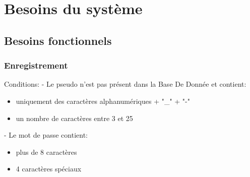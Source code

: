 \documentclass[french, utf8]{article}
\newcommand*{\MyIncludeGraphicsMaxSize}[2][]{%
\begin{adjustbox}{max size={\textwidth}{\textheight}}
    \texttt{[image: \#2]}%
\end{adjustbox}
}
\begin{document}
\newpage
\section{Besoins du système}

\subsection{Besoins fonctionnels}
\begin{comment}
\subsubsection{Lancement}
\label{sec:Lancement}
Le programme, à son lancement,
affiche une fenêtre d'accueil contenant le titre du jeu et demande à l’utilisateur d'entrer :
\\un pseudo
\\un mot de passe

\MyIncludeGraphicsMaxSize{Image/connexion-sequence-shrodinger-user.png}


\end{comment}

\subsubsection{Enregistrement}
\label{sec:Enregistrement}
Conditions:
\newline
- Le pseudo n'est pas présent dans la Base De Donnée et contient:
\begin{itemize}
\item uniquement des caractères alphanumériques + "\_" + "-"
\item un nombre de caractères entre 3 et 25
\end{itemize}

- Le mot de passe contient:
\begin{itemize}
\item plus de 8 caractères
\item 4 caractères spéciaux
\end{itemize}
\end{document}
